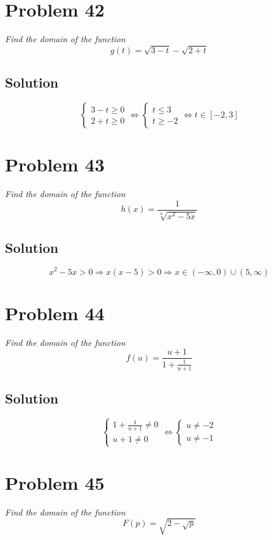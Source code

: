 \documentclass[11pt]{article}
\newcommand{\soln}{\subsection*}
\newcommand{\qn}{\textit}
\begin{document}
\section*{Problem 42}

\qn{Find the domain of the function $$g(t)=\sqrt{3-t}-\sqrt{2+t}$$}

\soln{Solution}
\begin{equation*}
	\begin{cases}
		3-t \ge 0 \\
		2+t \ge 0
	\end{cases}
	\Leftrightarrow
	\begin{cases}
		t \le 3 \\
		t \ge -2
	\end{cases}
	\Leftrightarrow
	t \in [-2, 3]
\end{equation*}

\section*{Problem 43}

\qn{Find the domain of the function $$h(x)=\frac{1}{\sqrt[4]{x^2-5x}}$$}

\soln{Solution}
\begin{equation*}
	x^2-5x>0 \Rightarrow x(x-5)>0 \Rightarrow x \in (-\infty, 0) \cup (5, \infty)
\end{equation*}

\section*{Problem 44}

\qn{Find the domain of the function $$f(u)=\frac{u+1}{1+\frac{1}{u+1}}$$}

\soln{Solution}
\begin{equation*}
	\begin{cases}
		1 + \frac{1}{u+1} \ne 0 \\
		u + 1 \ne 0
	\end{cases}
	\Leftrightarrow
	\begin{cases}
		u \ne -2 \\
		u \ne -1
	\end{cases}
\end{equation*}

\section*{Problem 45}

\qn{Find the domain of the function $$F(p)=\sqrt{2-\sqrt{p}}$$}
\end{document}
